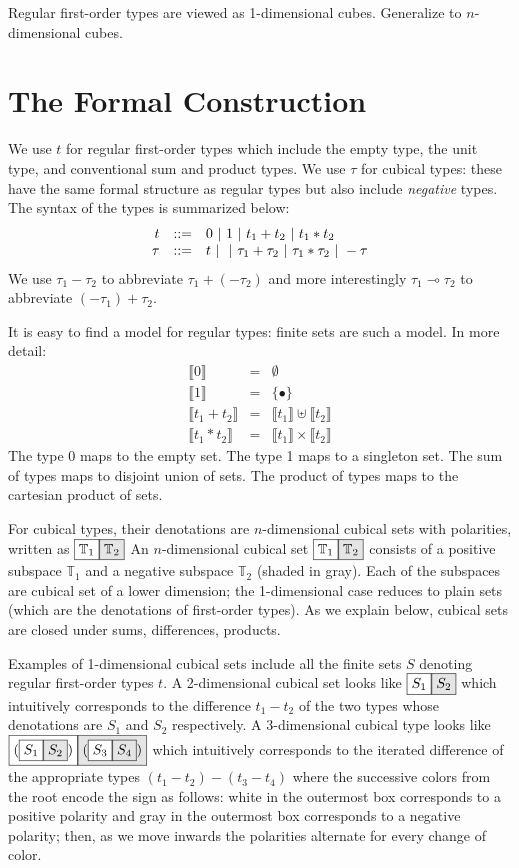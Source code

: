 \documentclass[authoryear,preprint]{sigplanconf}
\newcommand{\lolli}{\multimap}
\newcommand{\cubt}{\mathbb{T}}
\newcommand{\den}[1]{\llbracket #1 \rrbracket}
\newcommand{\nodet}[2]{\fcolorbox{black}{white}{$#1$}\fcolorbox{black}{gray!20}{$#2$}}
\begin{document}
Regular first-order types are viewed as 1-dimensional cubes. Generalize to
$n$-dimensional cubes. 

\section{The Formal Construction} 

We use $t$ for regular first-order types which include the empty type, the
unit type, and conventional sum and product types.  We use $\tau$ for cubical
types: these have the same formal structure as regular types but also include
\emph{negative} types. The syntax of the types is summarized below:
\[\begin{array}{rcl}
t &::=& 0 ~|~ 1 ~|~ t_1 + t_2 ~|~ t_1 * t_2 \\
\tau &::=& t ~|~ 
      ~|~ \tau_1 + \tau_2
      ~|~ \tau_1 * \tau_2
      ~|~ - \tau
\end{array}\]
We use $\tau_1 - \tau_2$ to abbreviate $\tau_1 + (- \tau_2)$ and more
interestingly $\tau_1 \lolli \tau_2$ to abbreviate $(- \tau_1) + \tau_2$.

It is easy to find a model for regular types: finite sets are such a
model. In more detail:
\[\begin{array}{rcl}
\den{0} &=& \emptyset \\
\den{1} &=& \{ \bullet \} \\
\den{t_1 + t_2} &=& \den{t_1} \uplus \den{t_2} \\
\den{t_1 * t_2} &=& \den{t_1} \times \den{t_2} 
\end{array}\]
The type 0 maps to the empty set. The type 1 maps to a singleton set. The sum
of types maps to disjoint union of sets. The product of types maps to the
cartesian product of sets. 

For cubical types, their denotations are $n$-dimensional cubical sets with
polarities, written as $\nodet{\cubt_1}{\cubt_2}$ An $n$-dimensional cubical
set $\nodet{\cubt_1}{\cubt_2}$ consists of a positive subspace $\cubt_1$ and
a negative subspace $\cubt_2$ (shaded in gray). Each of the subspaces are
cubical set of a lower dimension; the 1-dimensional case reduces to plain
sets (which are the denotations of first-order types). As we explain below,
cubical sets are closed under sums, differences, products.

Examples of 1-dimensional cubical sets include all the finite sets $S$
denoting regular first-order types $t$. A 2-dimensional cubical set looks
like $\nodet{S_1}{S_2}$ which intuitively corresponds to the difference $t_1
- t_2$ of the two types whose denotations are $S_1$ and $S_2$ respectively. A
3-dimensional cubical type looks like
$\nodet{(\nodet{S_1}{S_2})}{(\nodet{S_3}{S_4})}$ which intuitively
corresponds to the iterated difference of the appropriate types
$(t_1-t_2)-(t_3-t_4)$ where the successive colors from the root encode the
sign as follows: white in the outermost box corresponds to a positive
polarity and gray in the outermost box corresponds to a negative polarity;
then, as we move inwards the polarities alternate for every change of
color. 
\end{document}
